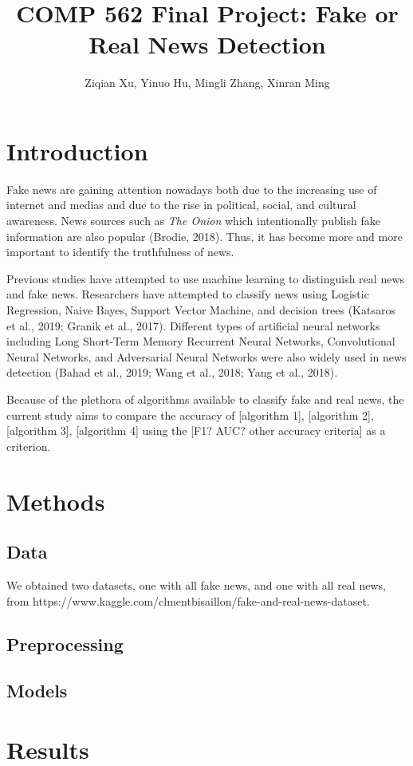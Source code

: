 \documentclass{article}
\title{COMP 562 Final Project: Fake or Real News Detection}
\author{Ziqian Xu, Yinuo Hu, Mingli Zhang, Xinran Ming}
\date{}
\begin{document}
\maketitle
\section{Introduction}
Fake news are gaining attention nowadays both due to the increasing use of internet and medias and due to the rise in political, social, and cultural awareness. News sources such as \emph{The Onion} which intentionally publish fake information are also popular (Brodie, 2018). Thus, it has become more and more important to identify the truthfulness of news.

Previous studies have attempted to use machine learning to distinguish real news and fake news. Researchers have attempted to classify news using Logistic Regression, Naive Bayes, Support Vector Machine, and decision trees (Katsaros et al., 2019; Granik et al., 2017). Different types of artificial neural networks including Long Short-Term Memory Recurrent Neural Networks, Convolutional Neural Networks, and Adversarial Neural Networks were also widely used in news detection (Bahad et al., 2019; Wang et al., 2018; Yang et al., 2018). 

Because of the plethora of algorithms available to classify fake and real news, the current study aims to compare the accuracy of [algorithm 1], [algorithm 2], [algorithm 3], [algorithm 4] using the [F1? AUC? other accuracy criteria] as a criterion. 

\section{Methods}
\subsection{Data}
We obtained two datasets, one with all fake news, and one with all real news, from https://www.kaggle.com/clmentbisaillon/fake-and-real-news-dataset. 
\subsection{Preprocessing}
\subsection{Models}

\section{Results}
\end{document}

